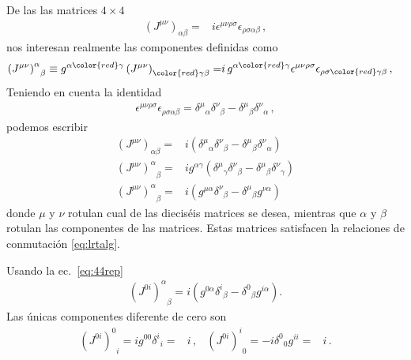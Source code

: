 \begin{frame}
De las las  matrices $4\times 4$ 
\begin{align}
   \left(J^{\mu\nu}\right)_{\alpha\beta}=&i\epsilon^{\mu\nu\rho\sigma}\epsilon_{\rho\sigma\alpha\beta}\,,
\end{align}
nos interesan realmente las componentes definidas como
\begin{align}
    { \left(J^{\mu\nu}\right)^{\alpha}}_{\beta}\equiv g^{\alpha {\color{red}\gamma}}\left(J^{\mu\nu}\right)_{{\color{red}\gamma}\beta}= &i\,g^{\alpha {\color{red}\gamma}}\epsilon^{\mu\nu\rho\sigma}\epsilon_{\rho\sigma {\color{red}\gamma} \beta}\,,
\end{align}
Teniendo en cuenta la identidad
\begin{align}
  \epsilon^{\mu\nu\rho\sigma}\epsilon_{\rho\sigma\alpha\beta}=
  {\delta^\mu}_\alpha{\delta^\nu}_\beta-{\delta^\mu}_\beta{\delta^\nu}_\alpha\,,
\end{align}
podemos escribir
\begin{align}
  \label{eq:44rep}
  \left(J^{\mu\nu}\right)_{\alpha\beta}  =&i\left({\delta^\mu}_\alpha{\delta^\nu}_\beta-{\delta^\mu}_\beta{\delta^\nu}_\alpha\right)\nonumber\\
 {\left(J^{\mu\nu}\right)^{\alpha}}_{\beta}=&ig^{\alpha\gamma}\left({\delta^{\mu}}_{\gamma}{\delta^\nu}_\beta-{\delta^\mu}_\beta{\delta^{\nu}}_\gamma\right) \nonumber\\
{\left(J^{\mu\nu}\right)^{\alpha}}_{\beta}  =  &i\left(g^{\mu\alpha}{\delta^\nu}_\beta-{\delta^\mu}_\beta g^{\nu\alpha}\right)
\end{align}
donde $\mu$ y $\nu$ rotulan cual de las dieciséis matrices se desea, mientras que $\alpha$ y $\beta$ rotulan las componentes de las matrices. Estas matrices satisfacen la relaciones de conmutación \eqref{eq:lrtalg}.

Usando la ec.~\eqref{eq:44rep}
\begin{align}
  {\left( J^{0i} \right)^{\alpha}}_{\beta}=
  i\left(g^{0\alpha}{\delta^i}_\beta-{\delta^0}_\beta g^{i\alpha}\right).
\end{align}
Las únicas componentes diferente de cero son
\begin{align}
  {\left( J^{0i} \right)^{0}}_{i}=ig^{00}{\delta^i}_i=&i\,,&
  {\left( J^{0i} \right)^{i}}_{0}=-i {\delta^0}_0 g^{ii}=&i\,.
\end{align}


\end{frame}
